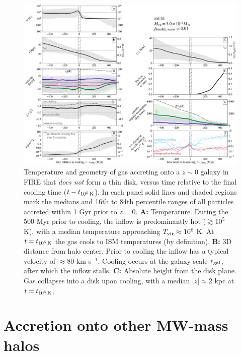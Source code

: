 \documentclass[fleqn,usenatbib]{mnras}
\newcommand{\tcon}{t_{10^5\,{\rm K}}}
\newcommand{\Tvir}{T_{\rm vir}}
\begin{document}
\begin{figure}
\includegraphics[width=\textwidth]{figures/before_and_after/before_and_after_allone_m11d_md.pdf}
\caption{
Temperature and geometry of gas accreting onto a $z\sim0$ galaxy in FIRE that {\em does not} form a thin disk, versus time relative to the final cooling time ($t - \tcon$).
In each panel solid lines and shaded regions mark the medians and 16th to 84th percentile ranges of all particles accreted within 1 Gyr prior to $z=0$.
\textbf{A:}
Temperature. During the 500 Myr prior to cooling, the inflow is predominantly hot ($\gtrsim 10^5$ K), with a median temperature approaching $\Tvir\approx10^6$ K. At $t = \tcon$ the gas cools to ISM temperatures (by definition).
\textbf{B:}
3D distance from halo center. Prior to cooling the inflow has a typical velocity of $\approx 80$ km s$^{-1}$. Cooling occurs at the galaxy scale $r_{\rm gal}$, after which the inflow stalls.
\textbf{C:}
Absolute height from the disk plane.
Gas collapses into a disk upon cooling, with a median $\vert z \vert \approx 2$ kpc at $t=\tcon$.
}
\label{f: counterexample}
\end{figure}

\section{Accretion onto other MW-mass halos}
\label{s: appendix-other m12s}
\end{document}
